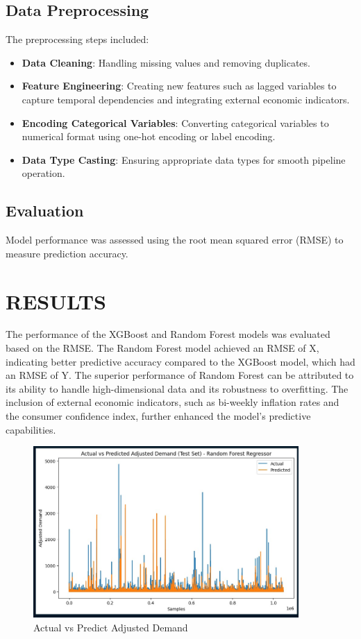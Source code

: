 \documentclass[letterpaper, 10 pt, conference]{ieeeconf}  %
\begin{document}
\subsection{Data Preprocessing}
The preprocessing steps included:
\begin{itemize}
        \item \textbf{Data Cleaning}: Handling missing values and removing duplicates.
        \item \textbf{Feature Engineering}: Creating new features such as lagged variables to capture temporal dependencies and integrating external economic indicators.
        \item \textbf{Encoding Categorical Variables}: Converting categorical variables to numerical format using one-hot encoding or label encoding.
        \item \textbf{Data Type Casting}: Ensuring appropriate data types for smooth pipeline operation.
\end{itemize}

\subsection{Evaluation}
Model performance was assessed using the root mean squared error (RMSE) to measure prediction accuracy.


\section{RESULTS}
The performance of the XGBoost and Random Forest models was evaluated based on the RMSE. The Random Forest model achieved an RMSE of X, indicating better predictive accuracy compared to the XGBoost model, which had an RMSE of Y. The superior performance of Random Forest can be attributed to its ability to handle high-dimensional data and its robustness to overfitting. The inclusion of external economic indicators, such as bi-weekly inflation rates and the consumer confidence index, further enhanced the model's predictive capabilities.

\begin{figure}[H] 
        \begin{center}
        \centering
        \includegraphics[width=0.9\textwidth]{images/comparison.jpg}
        \caption{Actual vs Predict Adjusted Demand}
        \end{center}
\end{figure} 
\end{document}
